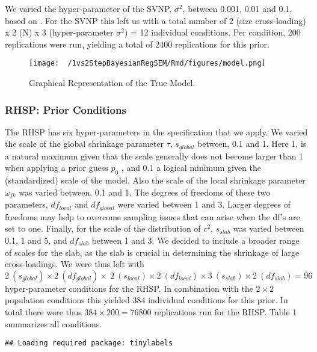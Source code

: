 \documentclass[]{interact}
\theoremstyle{plain}%
\theoremstyle{definition}
\theoremstyle{remark}
\begin{document}
We varied the hyper-parameter of the SVNP, \(\sigma^2\), between 0.001,
0.01 and 0.1, based on \citet{muthen_bayesian_2012}. For the SVNP this
left us with a total number of 2 (size cross-loading) x 2 (N) x 3
(hyper-parameter \(\sigma^2\)) = 12 individual conditions. Per
condition, 200 replications were run, yielding a total of 2400
replications for this prior.

\begin{figure}
\centering
\texttt{[image: ~/1vs2StepBayesianRegSEM/Rmd/figures/model.png]}
\caption{Graphical Representation of the True Model.}
\end{figure}

\hypertarget{rhsp-prior-conditions}{%
\subsubsection{RHSP: Prior Conditions}\label{rhsp-prior-conditions}}

The RHSP has six hyper-parameters in the specification that we apply. We
varied the scale of the global shrinkage parameter \(\tau\),
\(s_{global}\) between, 0.1 and 1. Here 1, is a natural maximum given
that the scale generally does not become larger than 1 when applying a
prior guess \(p_0\) \citep{piironen_sparsity_2017}, and 0.1 a logical
minimum given the (standardized) scale of the model. Also the scale of
the local shrinkage parameter \(\omega_{jk}\) was varied between, 0.1
and 1. The degrees of freedoms of these two parameters, \(df_{local}\)
and \(df_{global}\) were varied between 1 and 3. Larger degrees of
freedoms may help to overcome sampling issues that can arise when the
df's are set to one. Finally, for the scale of the distribution of
\(c^2\), \(s_{slab}\) was varied between 0.1, 1 and 5, and \(df_{slab}\)
between 1 and 3. We decided to include a broader range of scales for the
slab, as the slab is crucial in determining the shrinkage of large
cross-loadings. We were thus left with
\(2 \ (s_{global}) \times 2 \ (df_{global}) \times \ 2 \ (s_{local}) \times2 \ (df_{local}) \times 3 \ (s_{slab}) \times2 \ (df_{slab}) = 96\)
hyper-parameter conditions for the RHSP. In combination with the
\(2 \times 2\) population conditions this yielded 384 individual
conditions for this prior. In total there were thus
\(384 \times 200 = 76800\) replications run for the RHSP. Table 1
summarizes all conditions.

\begin{verbatim}
## Loading required package: tinylabels
\end{verbatim}
\end{document}
